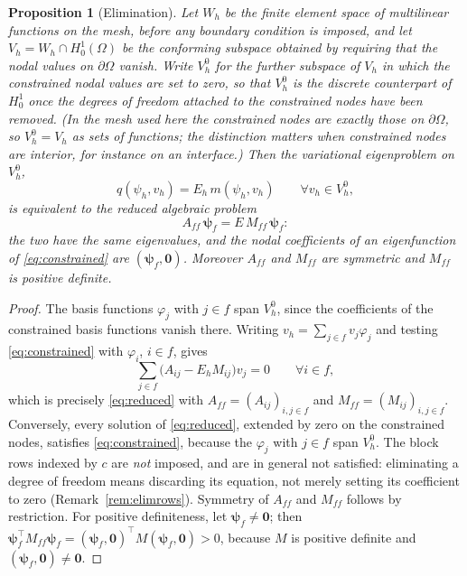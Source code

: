 \documentclass[pdflatex,sn-mathphys-num]{sn-jnl}
\theoremstyle{thmstyleone}%
\newtheorem{proposition}{Proposition}%
\theoremstyle{thmstyletwo}%
\theoremstyle{thmstylethree}%
\begin{document}
\begin{proposition}[Elimination]\label{prop:elim}
Let $W_h$ be the finite element space of multilinear functions on the mesh,
\emph{before} any boundary condition is imposed, and let
$V_h = W_h \cap H^1_0(\Omega)$ be the conforming subspace obtained by requiring
that the nodal values on $\partial\Omega$ vanish. Write
$V_h^0$ for the further subspace of $V_h$ in which the constrained nodal values
are set to zero, so that $V_h^0$ is the discrete counterpart of $H^1_0$ once the
degrees of freedom attached to the constrained nodes have been removed. (In the
mesh used here the constrained nodes are exactly those on $\partial\Omega$, so
$V_h^0 = V_h$ as sets of functions; the distinction matters when constrained
nodes are interior, for instance on an interface.) Then the variational
eigenproblem on $V_h^0$,
%
\begin{equation}\label{eq:constrained}
  q(\psi_h, v_h) = E_h\, m(\psi_h, v_h)
  \qquad \forall v_h \in V_h^0 ,
\end{equation}
%
is equivalent to the reduced algebraic problem
%
\begin{equation}\label{eq:reduced}
  A_{ff}\,\boldsymbol{\psi}_f = E\,M_{ff}\,\boldsymbol{\psi}_f :
\end{equation}
%
the two have the same eigenvalues, and the nodal coefficients of an
eigenfunction of \eqref{eq:constrained} are
$(\boldsymbol{\psi}_f, \mathbf{0})$. Moreover $A_{ff}$ and $M_{ff}$ are
symmetric and $M_{ff}$ is positive definite.
\end{proposition}

\begin{proof}
The basis functions $\varphi_j$ with $j \in f$ span $V_h^0$, since the
coefficients of the constrained basis functions vanish there. Writing
$v_h = \sum_{j\in f} v_j \varphi_j$ and testing \eqref{eq:constrained} with
$\varphi_i$, $i \in f$, gives
%
\begin{equation}
  \sum_{j\in f}\bigl(A_{ij} - E_h M_{ij}\bigr) v_j = 0
  \qquad \forall i \in f ,
\end{equation}
%
which is precisely \eqref{eq:reduced} with
$A_{ff} = (A_{ij})_{i,j\in f}$ and $M_{ff} = (M_{ij})_{i,j\in f}$. Conversely,
every solution of \eqref{eq:reduced}, extended by zero on the constrained nodes,
satisfies \eqref{eq:constrained}, because the $\varphi_j$ with $j \in f$ span
$V_h^0$. The block rows indexed by $c$ are \emph{not} imposed, and are in general
not satisfied: eliminating a degree of freedom means discarding its equation,
not merely setting its coefficient to zero (Remark~\ref{rem:elimrows}).
Symmetry of $A_{ff}$ and $M_{ff}$ follows by restriction. For positive
definiteness, let $\boldsymbol{\psi}_f \neq \mathbf{0}$; then
$\boldsymbol{\psi}_f^\top M_{ff}\boldsymbol{\psi}_f
= (\boldsymbol{\psi}_f,\mathbf{0})^\top M(\boldsymbol{\psi}_f,\mathbf{0}) > 0$,
because $M$ is positive definite and
$(\boldsymbol{\psi}_f,\mathbf{0}) \neq \mathbf{0}$.
\end{proof}
\end{document}
